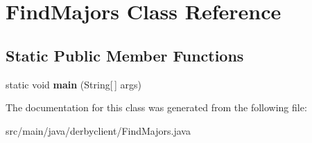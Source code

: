 \hypertarget{classFindMajors}{}\section{Find\+Majors Class Reference}
\label{classFindMajors}
\subsection*{Static Public Member Functions}
\begin{DoxyCompactItemize}
\item 
\mbox{\label{classFindMajors_af828d860d0a2ecb4848eb4066686d4ee}} 
static void {\bfseries main} (String\mbox{[}$\,$\mbox{]} args)
\end{DoxyCompactItemize}


The documentation for this class was generated from the following file\+:\begin{DoxyCompactItemize}
\item 
src/main/java/derbyclient/Find\+Majors.\+java\end{DoxyCompactItemize}
